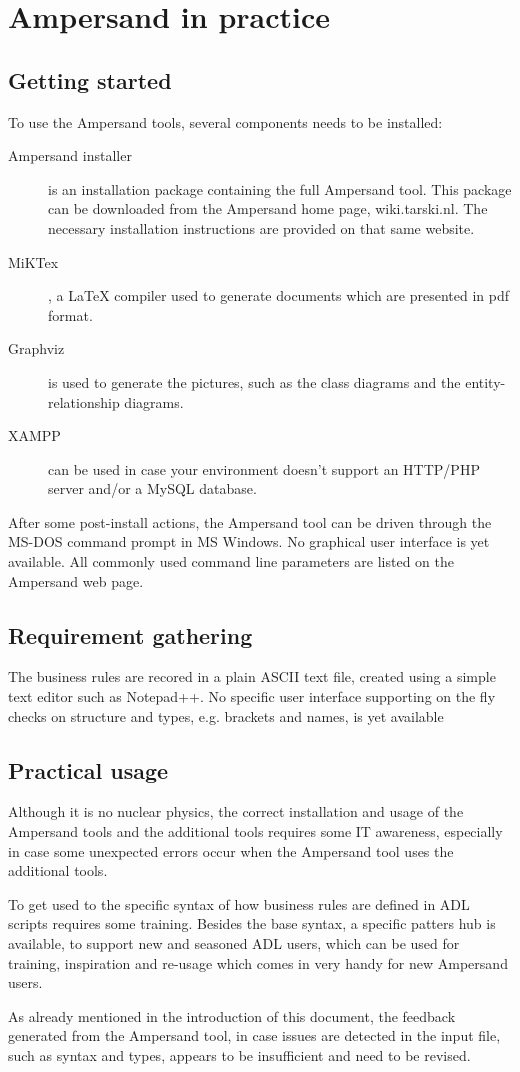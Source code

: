 
\section{Ampersand in practice}
\label{sec:errors}

\subsection{Getting started}
To use the Ampersand tools, several components needs to be installed:
\begin{description}
	\item[Ampersand installer] is an installation package containing the full Ampersand tool. This package can be downloaded from the Ampersand home page, wiki.tarski.nl. The necessary installation instructions are provided on that same website.
	\item[MiKTex], a LaTeX compiler used to generate documents which are presented in pdf format.
	\item[Graphviz] is used to generate the pictures, such as the class diagrams and the entity-relationship diagrams. 
	\item[XAMPP] can be used in case your environment doesn't support an HTTP/PHP server and/or a MySQL database.
\end{description}

After some post-install actions, the Ampersand tool can be driven through the MS-DOS command prompt in MS Windows. 
No graphical user interface is yet available. All commonly used command line parameters are listed on the Ampersand web page.

\subsection{Requirement gathering}
The business rules are recored in a plain ASCII text file, created using a simple text editor such as Notepad++.
No specific user interface supporting on the fly checks on structure and types, e.g. brackets and names, is yet available 

\subsection{Practical usage}
Although it is no nuclear physics, the correct installation and usage of the Ampersand tools and the additional tools requires some IT awareness, especially in case some unexpected errors occur when the Ampersand tool uses the additional tools. 

To get used to the specific syntax of how business rules are defined in ADL scripts requires some training. 
Besides the base syntax, a specific patters hub is available, to support new and seasoned ADL users,  which can be used for training, inspiration and re-usage which comes in very handy for new Ampersand users.

As already mentioned in the introduction of this document, the feedback generated from the Ampersand tool, in case  issues are detected in the input file, such as syntax and types, appears to be insufficient and need to be revised.